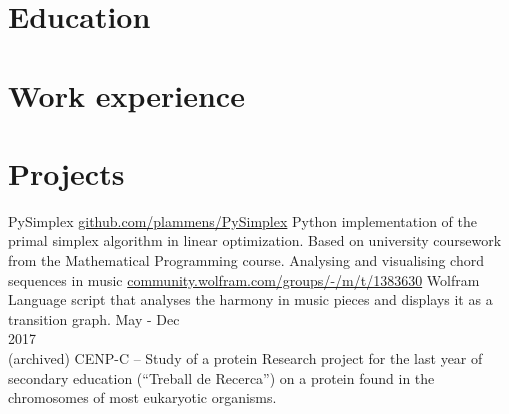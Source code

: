 \documentclass[]{resume}
\begin{document}
\newcommand{\itemwidth}{10cm}
\newcommand{\chronowidth}{2.5cm}


\begin{adjustwidth}{10pt}{10pt}

\section*{Education}


\renewcommand{\twentylen}{\itemwidth}
\begin{twenty}[\chronowidth]
    
    
\end{twenty}



\section*{Work experience}
\renewcommand{\twentylen}{\itemwidth}
\begin{twenty}[\chronowidth]
    
\end{twenty}


\section*{Projects}

\renewcommand{\twentylen}{\itemwidth}
\begin{twenty}[\chronowidth]
      {PySimplex}
      {\href{https://github.com/plammens/PySimplex}{github.com/plammens/PySimplex}}
      {Python implementation of the primal simplex algorithm in linear optimization. Based on university coursework from the Mathematical Programming course.}
      {Analysing and visualising chord sequences in music}
      {\href{https://community.wolfram.com/groups/-/m/t/1383630}{community.wolfram.com/groups/-/m/t/1383630}}
      {Wolfram Language script that analyses the harmony in music pieces and displays it as a transition graph.}
  \twentyitem
      {May - Dec \\ 2017 \\ (archived)}
      {CENP-C – Study of a protein}
      {}
      {Research project for the last year of secondary education (“Treball de Recerca”) on a protein found in the chromosomes of most eukaryotic organisms.}
\end{twenty}




\end{adjustwidth}
\end{document}
